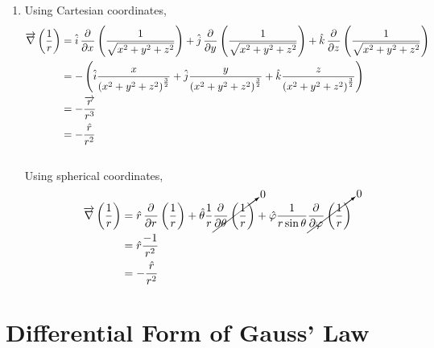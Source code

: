 \documentclass[fleqn, a4paper, 12pt, twoside]{article}
\theoremstyle{definition}
\theoremstyle{theorem}
\begin{document}
\begin{solution}
\begin{enumerate}[leftmargin=*]
		\item
			Using Cartesian coordinates,
			\begin{align*}
				\overrightarrow{\nabla} \left( \frac{1}{r} \right) & = \hat{i} \dpd{}{x} \left( \frac{1}{\sqrt{x^2 + y^2 + z^2}} \right) + \hat{j} \dpd{}{y} \left( \frac{1}{\sqrt{x^2 + y^2 + z^2}} \right) + \hat{k} \dpd{}{z} \left( \frac{1}{\sqrt{x^2 + y^2 + z^2}} \right)         \\
                                                                                   & = - \left( \hat{i} \frac{x}{\left( x^2 + y^2 + z^2 \right)^{\frac{3}{2}}} + \hat{j} \frac{y}{\left( x^2 + y^2 + z^2 \right)^{\frac{3}{2}}} + \hat{k} \frac{z}{\left( x^2 + y^2 + z^2 \right)^{\frac{3}{2}}} \right) \\
                                                                                   & = -\frac{\overrightarrow{r}}{r^3}                                                                                                                                                                                   \\
                                                                                   & = -\frac{\hat{r}}{r^2}
			\end{align*}
			~\\
			Using spherical coordinates,
			\begin{align*}
				\overrightarrow{\nabla} \left( \frac{1}{r} \right) & = \hat{r} \dpd{}{r} \left( \frac{1}{r} \right) + \hat{\theta} \dfrac{1}{r} \cancelto{0}{\dpd{}{\theta} \left( \frac{1}{r} \right)} + \hat{\varphi} \frac{1}{r \sin \theta} \cancelto{0}{\dpd{}{\varphi} \left( \frac{1}{r} \right)} \\
                                                                                   & = \hat{r} \frac{-1}{r^2}                                                                                                                                                                                \\
                                                                                   & = -\frac{\hat{r}}{r^2}
			\end{align*}
	\end{enumerate}
\end{solution}

\section{Differential Form of Gauss' Law}
\end{document}

